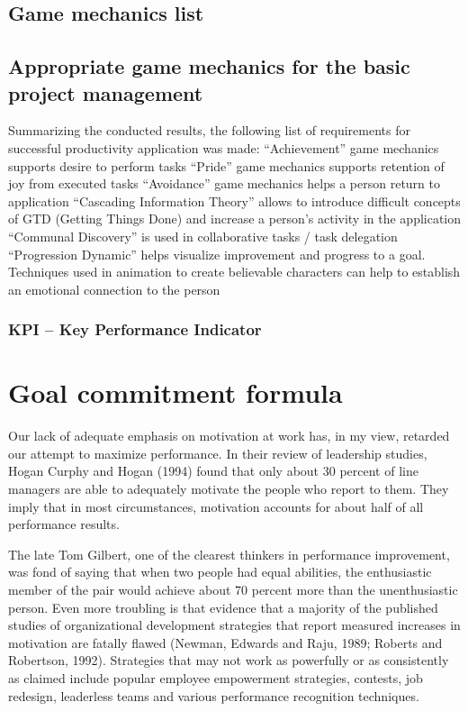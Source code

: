 \subsection{Game mechanics list}



\subsection{Appropriate game mechanics for the basic project management}

Summarizing the conducted results, the following list of requirements for successful productivity application was made:
“Achievement” game mechanics supports desire to perform tasks
“Pride” game mechanics supports retention of joy from executed tasks
“Avoidance” game mechanics helps a person return to application
“Cascading Information Theory” allows to introduce difficult concepts of GTD (Getting Things Done) and increase a person’s activity in the application
“Communal Discovery” is used in collaborative tasks / task delegation
“Progression Dynamic” helps visualize improvement and progress to a goal.
Techniques used in animation to create believable characters can help to establish an emotional connection to the person

\subsubsection{KPI -- Key Performance Indicator}

\section{Goal commitment formula}

Our lack of adequate emphasis on motivation at work has, in my view, retarded our attempt to maximize performance. In their review of leadership studies, Hogan Curphy and Hogan (1994) found that only about 30 percent of line managers are able to adequately motivate the people who report to them. They imply that in most circumstances, motivation accounts for about half of all performance results.

The late Tom Gilbert, one of the clearest thinkers in performance improvement, was fond of saying that when two people had equal abilities, the enthusiastic member of the pair would achieve about 70 percent more than the unenthusiastic person. Even more troubling is that evidence that a majority of the published studies of organizational development strategies that report measured increases in motivation are fatally flawed (Newman, Edwards and Raju, 1989; Roberts and Robertson, 1992). Strategies that may not work as powerfully or as consistently as claimed include popular employee empowerment strategies, contests, job redesign, leaderless teams and various performance recognition techniques.

